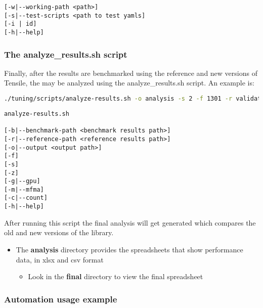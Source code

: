 \documentclass[]{article}
\begin{document}
\begin{verbatim}	
[-w|--working-path <path>] 
[-s|--test-scripts <path to test yamls] 
[-i | id]
[-h|--help]
\end{verbatim}

\subsubsection{The analyze\_results.sh script}

Finally, after the results are benchmarked using the reference and new versions of Tensile, the may be analyzed using the analyze\_results.sh script. An example is:

\begin{lstlisting}[language=bash,breaklines=true]
./tuning/scripts/analyze-results.sh -o analysis -s 2 -f 1301 -r validate/rocblas/rocBLAS-reference/build/release/clients/staging/results -b validate/rocblas/rocBLAS-verify/build/release/clients/staging/results 
\end{lstlisting}

\begin{verbatim}
analyze-results.sh 

[-b|--benchmark-path <benchmark results path>]
[-r|--reference-path <reference results path>] 
[-o|--output <output path>] 
[-f] 
[-s] 
[-z] 
[-g|--gpu] 
[-m|--mfma] 
[-c|--count] 
[-h|--help]
\end{verbatim}

After running this script the final analysis will get generated which compares the old and new versions of the library. 

\begin{itemize}
	\item The \textbf{analysis} directory provides the spreadsheets that show performance data, in xlsx and csv format 
	\begin{itemize}
		\item 	Look in the \textbf{final} directory to view the final spreadsheet
	\end{itemize}

\end{itemize}

\subsubsection{Automation usage example}
\end{document}

